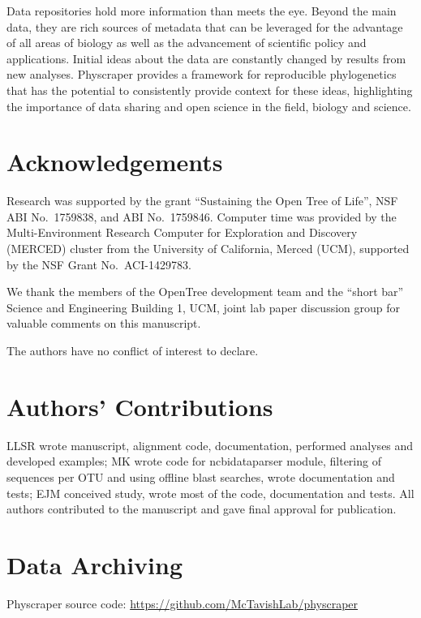 \documentclass[]{article}
\begin{document}
Data repositories hold more information than meets the eye.
Beyond the main data, they are rich sources of metadata that can be leveraged for the advantage of all areas of biology as well as the advancement of scientific policy and applications.
Initial ideas about the data are constantly changed by results from new analyses.
Physcraper provides a framework for reproducible phylogenetics that has the potential to consistently provide context for these ideas, highlighting the importance of data sharing and open science in the field, biology and science.

\hypertarget{acknowledgements}{%
\section{Acknowledgements}\label{acknowledgements}}

Research was supported by the grant ``Sustaining the Open Tree of Life'', NSF ABI No.~1759838, and ABI No.~1759846.
Computer time was provided by the Multi-Environment Research Computer for Exploration and Discovery (MERCED) cluster from the University of California, Merced (UCM), supported by the NSF Grant No.~ACI-1429783.

We thank the members of the OpenTree development team and the ``short bar'' Science and Engineering Building 1, UCM, joint lab paper discussion group for valuable comments on this manuscript.

The authors have no conflict of interest to declare.

\hypertarget{authors-contributions}{%
\section{Authors' Contributions}\label{authors-contributions}}

LLSR wrote manuscript, alignment code, documentation, performed analyses and developed examples; MK wrote code for ncbidataparser module, filtering of sequences per OTU and using offline blast searches, wrote documentation and tests; EJM conceived study, wrote most of the code, documentation and tests.
All authors contributed to the manuscript and gave final approval for publication.

\hypertarget{data-archiving}{%
\section{Data Archiving}\label{data-archiving}}

Physcraper source code: \url{https://github.com/McTavishLab/physcraper}
\end{document}
